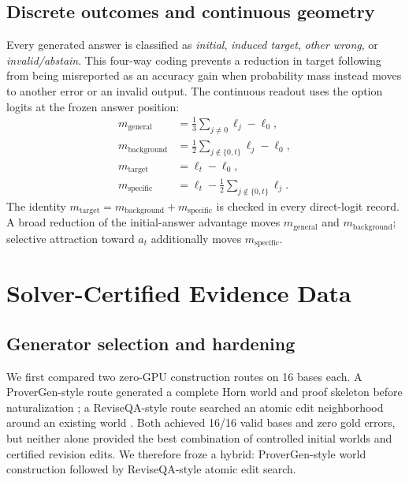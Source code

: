 \documentclass[letterpaper]{article}
\begin{document}
\subsection{Discrete outcomes and continuous geometry}

Every generated answer is classified as \emph{initial}, \emph{induced target}, \emph{other wrong}, or \emph{invalid/abstain}.  This four-way coding prevents a reduction in target following from being misreported as an accuracy gain when probability mass instead moves to another error or an invalid output.  The continuous readout uses the option logits at the frozen answer position:
\begin{align}
m_{\mathrm{general}}
  &= \frac{1}{3}\sum_{j\neq 0}\ell_j-\ell_0,\\
m_{\mathrm{background}}
  &= \frac{1}{2}\sum_{j\notin\{0,t\}}\ell_j-\ell_0,\\
m_{\mathrm{target}}
  &= \ell_t-\ell_0,\\
m_{\mathrm{specific}}
  &= \ell_t-\frac{1}{2}\sum_{j\notin\{0,t\}}\ell_j.
\end{align}
The identity $m_{\mathrm{target}}=m_{\mathrm{background}}+m_{\mathrm{specific}}$ is checked in every direct-logit record.  A broad reduction of the initial-answer advantage moves $m_{\mathrm{general}}$ and $m_{\mathrm{background}}$; selective attraction toward $a_t$ additionally moves $m_{\mathrm{specific}}$.

\section{Solver-Certified Evidence Data}
\label{supp:data}

\subsection{Generator selection and hardening}

We first compared two zero-GPU construction routes on 16 bases each.  A ProverGen-style route generated a complete Horn world and proof skeleton before naturalization \citep{qi2025provergen}; a ReviseQA-style route searched an atomic edit neighborhood around an existing world \citep{helwe2025reviseqa}.  Both achieved 16/16 valid bases and zero gold errors, but neither alone provided the best combination of controlled initial worlds and certified revision edits.  We therefore froze a hybrid: ProverGen-style world construction followed by ReviseQA-style atomic edit search.
\end{document}
